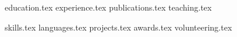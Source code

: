 \documentclass[letterpaper,11pt]{article}
\begin{document}

{education.tex}
{experience.tex}
{publications.tex}
{teaching.tex}

\pagebreak

\sidebyside
    {{skills.tex}}
    {{languages.tex}}
{projects.tex}
{awards.tex}
{volunteering.tex}
\end{document}
